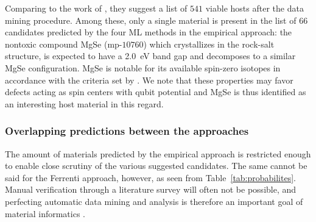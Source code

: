 \documentclass[superscriptaddress,
preprint,
 amsmath,amssymb,
 aps,
]{revtex4-2}
\newcommand{\mrk}[1]{\textcolor{red}{#1}}
\begin{document}
Comparing to the work of \citeauthor{Ferrenti2020} \cite{Ferrenti2020}, they suggest a list of $541$ viable hosts after the data mining procedure.  
Among these, only a single material is present in the list of $66$ candidates predicted by the four ML methods in the empirical approach: the nontoxic compound MgSe (mp-$10760$) which crystallizes in the rock-salt structure, is expected to have a \SI{2.0}{\electronvolt} band gap and decomposes to a similar MgSe configuration. 
MgSe is notable for its available spin-zero isotopes in accordance with the criteria set by \citeauthor{Weber2010} \cite{Weber2010}.  
We note that these properties may favor defects acting as spin centers with qubit potential and MgSe is thus identified as an interesting host material in this regard.   

\subsubsection*{Overlapping predictions between the approaches}

The amount of materials predicted by the empirical approach is restricted enough to enable close scrutiny of the various suggested candidates. The same cannot be said for the Ferrenti approach, however, as seen from Table~\ref{tab:probabilites}. Manual verification through a literature survey will often not be possible, and perfecting automatic data mining and analysis is therefore an important goal of material informatics \cite{rickman2019}. 
\end{document}
